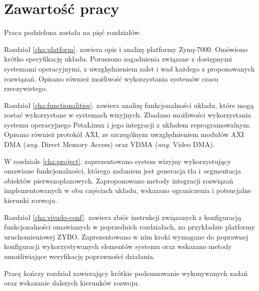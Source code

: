 \section{Zawartość pracy}

Praca podzielona została na pięć rozdziałów.

Rozdział \ref{cha:platform}. zawiera opis i analizę platformy Zynq-7000. Omówiono krótko specyfikację układu. Poruszono zagadnienia związane z dostępnymi systemami operacyjnymi, z uwzględnieniem zalet i wad każdego z proponowanych rozwiązań. Opisano również możliwość wykorzystania systemów czasu rzeczywistego.

Rozdział \ref{cha:functionalities}. zawiera analizę funkcjonalności układu, które mogą zostać wykorzystane w systemach wizyjnych. Zbadano możliwości wykorzystania systemu operacyjnego PetaLinux i jego integracji z układem reprogramowalnym. Opisano również protokół AXI, ze szczególnym uwzględnieniem modułów AXI DMA (\emph{ang.} Direct Memory Access) oraz VDMA (\emph{ang.} Video DMA).

W rozdziale \ref{cha:project}. zaprezentowano system wizyjny wykorzystujący omawiane funkcjonalności, którego zadaniem jest generacja tła i~segmentacja obiektów pierwszoplanowych. Zaproponowano metody integracji rozwiązań implementowanych w obu częściach układu, wskazano ograniczenia i potencjalne kierunki rozwoju.

Rozdział \ref{cha:vivado-conf}. zawiera zbiór instrukcji związanych z konfiguracją funkcjonalności omawianych w poprzednich rozdziałach, na przykładzie platformy uruchomieniowej ZYBO. Zaprezentowano w nim kroki wymagane do poprawnej konfiguracji wykorzystywanych elementów systemu oraz wskazano metody umożliwiające weryfikację poprawności działania.

Pracę kończy rozdział zawierający krótkie podsumowanie wykonywanych zadań oraz wskazanie dalszych kierunków rozwoju.
